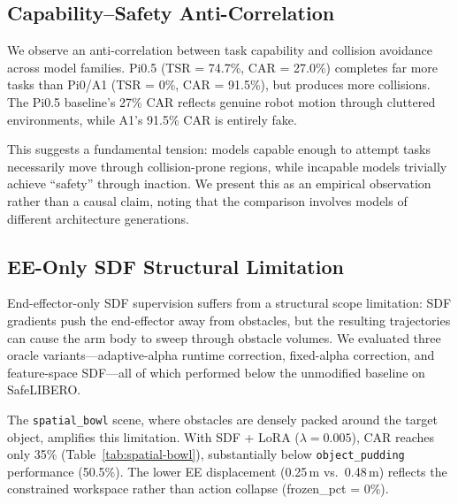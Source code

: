 \documentclass[letterpaper]{article}
\begin{document}
\subsection{Capability--Safety Anti-Correlation}
\label{sec:capability-safety}

We observe an anti-correlation between task capability and collision avoidance across model families. Pi0.5 (TSR = 74.7\%, CAR = 27.0\%) completes far more tasks than Pi0/A1 (TSR = 0\%, CAR = 91.5\%), but produces more collisions. The Pi0.5 baseline's 27\% CAR reflects genuine robot motion through cluttered environments, while A1's 91.5\% CAR is entirely fake.

This suggests a fundamental tension: models capable enough to attempt tasks necessarily move through collision-prone regions, while incapable models trivially achieve ``safety'' through inaction. We present this as an empirical observation rather than a causal claim, noting that the comparison involves models of different architecture generations.


\subsection{EE-Only SDF Structural Limitation}
\label{sec:ee-limitation}

End-effector-only SDF supervision suffers from a structural scope limitation: SDF gradients push the end-effector away from obstacles, but the resulting trajectories can cause the arm body to sweep through obstacle volumes. We evaluated three oracle variants---adaptive-alpha runtime correction, fixed-alpha correction, and feature-space SDF---all of which performed below the unmodified baseline on SafeLIBERO.

The \texttt{spatial\_bowl} scene, where obstacles are densely packed around the target object, amplifies this limitation. With SDF + LoRA ($\lambda = 0.005$), CAR reaches only 35\% (Table~\ref{tab:spatial-bowl}), substantially below \texttt{object\_pudding} performance (50.5\%). The lower EE displacement (0.25\,m vs.\ 0.48\,m) reflects the constrained workspace rather than action collapse (frozen\_pct = 0\%).
\end{document}
